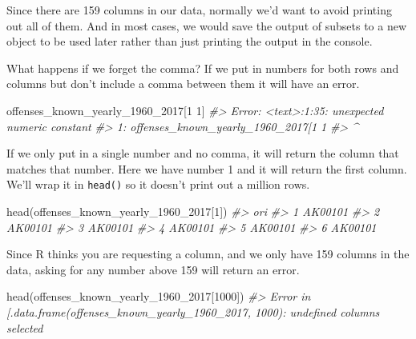 \documentclass[
]{krantz}
\makeatletter
\newenvironment{Shaded}{\begin{snugshade}}{\end{snugshade}}
\newcommand{\CommentTok}[1]{\textcolor[rgb]{0.37,0.37,0.37}{\textit{#1}}}
\newcommand{\DecValTok}[1]{\textcolor[rgb]{0.06,0.06,0.06}{#1}}
\newcommand{\FunctionTok}[1]{\textcolor[rgb]{0,0,0}{#1}}
\newcommand{\NormalTok}[1]{#1}
\newenvironment{kframe}{%
\medskip{}
\setlength{\fboxsep}{.8em}
 \def\at@end@of@kframe{}%
 \ifinner\ifhmode%
  \def\at@end@of@kframe{\end{minipage}}%
  \begin{minipage}{\columnwidth}%
 \fi\fi%
 \def\FrameCommand##1{\hskip\@totalleftmargin \hskip-\fboxsep
 \colorbox{shadecolor}{##1}\hskip-\fboxsep
     \hskip-\linewidth \hskip-\@totalleftmargin \hskip\columnwidth}%
 \MakeFramed {\advance\hsize-\width
   \@totalleftmargin\z@ \linewidth\hsize
   \@setminipage}}%
 {\par\unskip\endMakeFramed%
 \at@end@of@kframe}
\renewenvironment{Shaded}{\begin{kframe}}{\end{kframe}}
\makeatother
\begin{document}
Since there are 159 columns in our data, normally we'd want to avoid printing out all of them. And in most cases, we would save the output of subsets to a new object to be used later rather than just printing the output in the console.

What happens if we forget the comma? If we put in numbers for both rows and columns but don't include a comma between them it will have an error.

\begin{Shaded}
\begin{Highlighting}[]
\NormalTok{offenses\_known\_yearly\_1960\_2017[}\DecValTok{1} \DecValTok{1}\NormalTok{]}
\CommentTok{\#\textgreater{} Error: \textless{}text\textgreater{}:1:35: unexpected numeric constant}
\CommentTok{\#\textgreater{} 1: offenses\_known\_yearly\_1960\_2017[1 1}
\CommentTok{\#\textgreater{}                                       \^{}}
\end{Highlighting}
\end{Shaded}

If we only put in a single number and no comma, it will return the column that matches that number. Here we have number 1 and it will return the first column. We'll wrap it in \texttt{head()} so it doesn't print out a million rows.

\begin{Shaded}
\begin{Highlighting}[]
\FunctionTok{head}\NormalTok{(offenses\_known\_yearly\_1960\_2017[}\DecValTok{1}\NormalTok{])}
\CommentTok{\#\textgreater{}       ori}
\CommentTok{\#\textgreater{} 1 AK00101}
\CommentTok{\#\textgreater{} 2 AK00101}
\CommentTok{\#\textgreater{} 3 AK00101}
\CommentTok{\#\textgreater{} 4 AK00101}
\CommentTok{\#\textgreater{} 5 AK00101}
\CommentTok{\#\textgreater{} 6 AK00101}
\end{Highlighting}
\end{Shaded}

Since R thinks you are requesting a column, and we only have 159 columns in the data, asking for any number above 159 will return an error.

\begin{Shaded}
\begin{Highlighting}[]
\FunctionTok{head}\NormalTok{(offenses\_known\_yearly\_1960\_2017[}\DecValTok{1000}\NormalTok{])}
\CommentTok{\#\textgreater{} Error in \textasciigrave{}[.data.frame\textasciigrave{}(offenses\_known\_yearly\_1960\_2017, 1000): undefined columns selected}
\end{Highlighting}
\end{Shaded}
\end{document}
